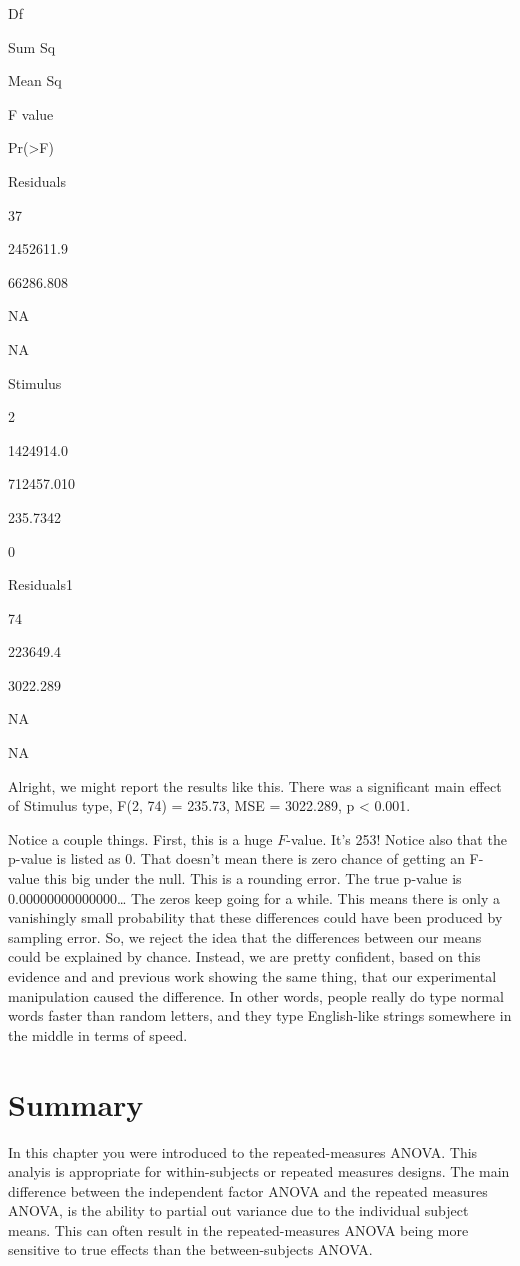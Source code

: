 \documentclass[]{book}
\begin{document}
Df

Sum Sq

Mean Sq

F value

Pr(\textgreater{}F)

Residuals

37

2452611.9

66286.808

NA

NA

Stimulus

2

1424914.0

712457.010

235.7342

0

Residuals1

74

223649.4

3022.289

NA

NA

Alright, we might report the results like this. There was a significant main effect of Stimulus type, F(2, 74) = 235.73, MSE = 3022.289, p \textless{} 0.001.

Notice a couple things. First, this is a huge \(F\)-value. It's 253! Notice also that the p-value is listed as 0. That doesn't mean there is zero chance of getting an F-value this big under the null. This is a rounding error. The true p-value is 0.00000000000000\ldots{} The zeros keep going for a while. This means there is only a vanishingly small probability that these differences could have been produced by sampling error. So, we reject the idea that the differences between our means could be explained by chance. Instead, we are pretty confident, based on this evidence and and previous work showing the same thing, that our experimental manipulation caused the difference. In other words, people really do type normal words faster than random letters, and they type English-like strings somewhere in the middle in terms of speed.

\hypertarget{summary}{%
\section{Summary}\label{summary}}

In this chapter you were introduced to the repeated-measures ANOVA. This analyis is appropriate for within-subjects or repeated measures designs. The main difference between the independent factor ANOVA and the repeated measures ANOVA, is the ability to partial out variance due to the individual subject means. This can often result in the repeated-measures ANOVA being more sensitive to true effects than the between-subjects ANOVA.
\end{document}
